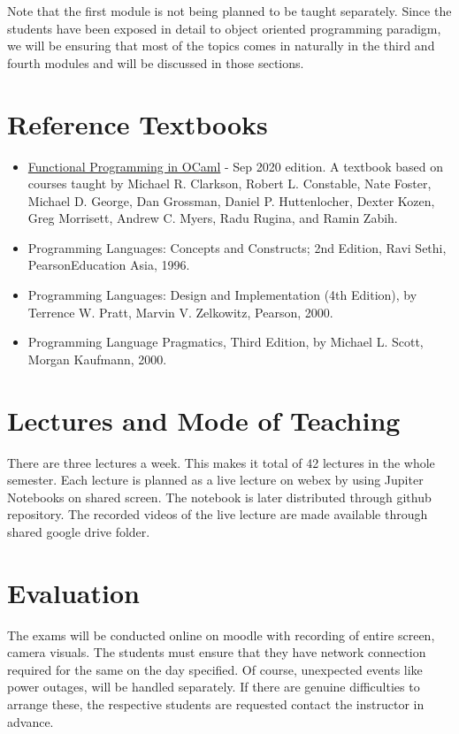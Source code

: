 \documentclass[10pt]{article}
\begin{document}
Note that the first module is not being planned to be taught separately. Since the students have been exposed in detail to object oriented programming paradigm, we will be ensuring that most of the topics comes in naturally in the third and fourth modules and will be discussed in those sections.



\section{Reference Textbooks}

\begin{itemize}
\item \href{https://www.cs.cornell.edu/courses/cs3110/2020sp/textbook/}{Functional Programming in OCaml} - Sep 2020 edition. A textbook based on courses taught by Michael R. Clarkson, Robert L. Constable, Nate Foster, Michael D. George, Dan Grossman, Daniel P. Huttenlocher, Dexter Kozen, Greg Morrisett, Andrew C. Myers, Radu Rugina, and Ramin Zabih.
\item Programming Languages: Concepts and Constructs; 2nd Edition, Ravi Sethi, PearsonEducation Asia, 1996.
\item Programming Languages: Design and Implementation (4th Edition), by Terrence W. Pratt, Marvin V. Zelkowitz, Pearson, 2000.
\item Programming Language Pragmatics, Third Edition, by Michael L. Scott, Morgan Kaufmann, 2000.
\end{itemize}

\section{Lectures and Mode of Teaching}
There are three lectures a week. This makes it total of 42 lectures in the whole semester. Each lecture is planned as a live lecture on webex by using Jupiter Notebooks on shared screen. The notebook is later distributed through github repository. The recorded videos of the live lecture are made available through shared google drive folder.

\section{Evaluation}

The exams will be conducted online on moodle with recording of entire screen, camera visuals. The students must ensure that they have network connection required for the same on the day specified. Of course, unexpected events like power outages, will be handled separately. If there are genuine difficulties to arrange these, the respective students are requested contact the instructor in advance.
\end{document}
